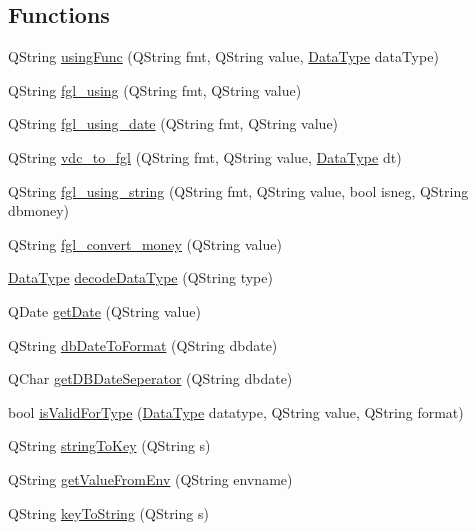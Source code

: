 \subsection*{Functions}
\begin{DoxyCompactItemize}
\item 
QString \hyperlink{namespaceFgl_a224ca31123410961b37ec74cac4c7b0a}{usingFunc} (QString fmt, QString value, \hyperlink{namespaceFgl_a221c9c0366d5227f8c27ca97308a691c}{DataType} dataType)
\item 
QString \hyperlink{namespaceFgl_a7757d5871d47d7ccaba56201a5c019be}{fgl\_\-using} (QString fmt, QString value)
\item 
QString \hyperlink{namespaceFgl_a9efb6ea5c503dd355a279fe691e51218}{fgl\_\-using\_\-date} (QString fmt, QString value)
\item 
QString \hyperlink{namespaceFgl_a588de0a8d9bc385030005007bde97a8d}{vdc\_\-to\_\-fgl} (QString fmt, QString value, \hyperlink{namespaceFgl_a221c9c0366d5227f8c27ca97308a691c}{DataType} dt)
\item 
QString \hyperlink{namespaceFgl_ac7ee6be1cf53ff2ffb34b25576689c24}{fgl\_\-using\_\-string} (QString fmt, QString value, bool isneg, QString dbmoney)
\item 
QString \hyperlink{namespaceFgl_abb08147dfe3b331ef854161e597f7927}{fgl\_\-convert\_\-money} (QString value)
\item 
\hyperlink{namespaceFgl_a221c9c0366d5227f8c27ca97308a691c}{DataType} \hyperlink{namespaceFgl_a2d5a9376ae8e5ebb28ddb1d016356ae4}{decodeDataType} (QString type)
\item 
QDate \hyperlink{namespaceFgl_a22923696c7e89efba943bfc065c9d3ea}{getDate} (QString value)
\item 
QString \hyperlink{namespaceFgl_acda3ef22ab61f74e6e9f401df8b77917}{dbDateToFormat} (QString dbdate)
\item 
QChar \hyperlink{namespaceFgl_a60e9729a00a40b0ce63428fe470fa284}{getDBDateSeperator} (QString dbdate)
\item 
bool \hyperlink{namespaceFgl_a7560ddc940aea8357bfae44485522b31}{isValidForType} (\hyperlink{namespaceFgl_a221c9c0366d5227f8c27ca97308a691c}{DataType} datatype, QString value, QString format)
\item 
QString \hyperlink{namespaceFgl_aa987ce49dbcf2c9fa730b64902e9c84e}{stringToKey} (QString s)
\item 
QString \hyperlink{namespaceFgl_acdc01c0826cbfc5bb18bea857765b751}{getValueFromEnv} (QString envname)
\item 
QString \hyperlink{namespaceFgl_a378c2347baa22e3b429ce42010887963}{keyToString} (QString s)
\end{DoxyCompactItemize}
